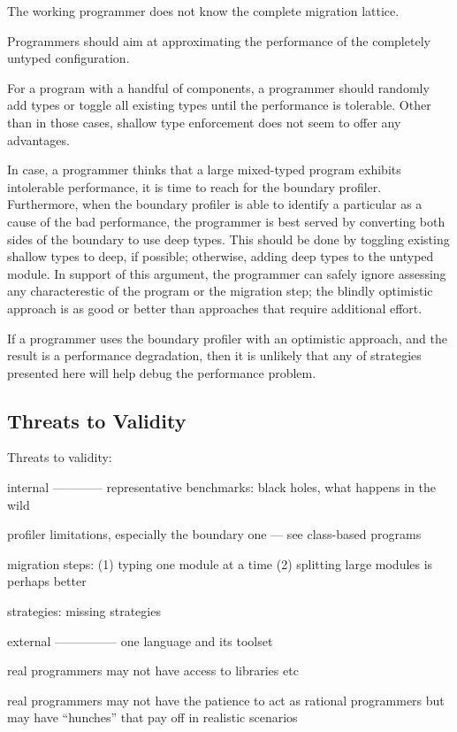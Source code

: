 
The working programmer does not know the complete migration lattice. 

Programmers should aim at approximating the performance of the completely
untyped configuration.


For a program with a handful of components, a programmer should randomly
add types or toggle all existing types until the performance is tolerable.
Other than in those cases, shallow type enforcement does not seem to
offer any advantages. 

In case, a programmer thinks that a large mixed-typed program exhibits
intolerable performance, it is time to reach for the boundary profiler.
Furthermore, when the boundary profiler is able to identify a particular
as a cause of the bad performance, the programmer is best served by
converting both sides of the boundary to use deep types.  This should be
done by toggling existing shallow types to deep, if possible; otherwise,
adding deep types to the untyped module.  In support of this argument, the
programmer can safely ignore assessing any characterestic of the program
or the migration step; the blindly optimistic approach is as good or
better than approaches that require additional effort. 

If a programmer uses the boundary profiler with an optimistic approach,
and the result is a performance degradation, then it is unlikely that any
of strategies presented here will help debug the performance problem. 


\subsection{Threats to Validity}


Threats to validity:

internal
————
representative benchmarks: black holes, what happens in the wild 


profiler limitations, especially the boundary one — see class-based
programs

migration steps: (1) typing one module at a time 
                 (2) splitting large modules is perhaps better

strategies: missing strategies


external
—————
one language and its toolset 

real programmers may not have access to libraries etc

real programmers may not have the patience to act as rational programmers
but may have ``hunches'' that pay off in realistic scenarios 


